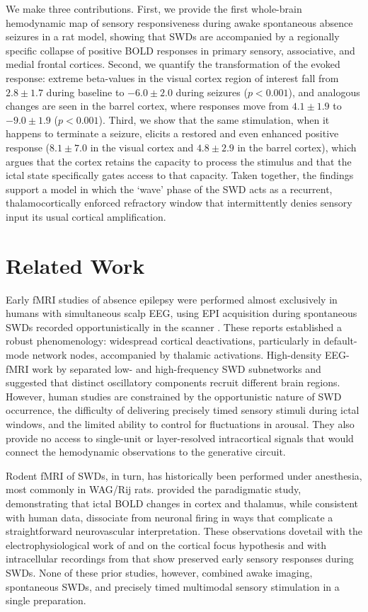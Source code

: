 We make three contributions. First, we provide the first whole-brain hemodynamic map of sensory responsiveness during awake spontaneous absence seizures in a rat model, showing that SWDs are accompanied by a regionally specific collapse of positive BOLD responses in primary sensory, associative, and medial frontal cortices. Second, we quantify the transformation of the evoked response: extreme beta-values in the visual cortex region of interest fall from $2.8 \pm 1.7$ during baseline to $-6.0 \pm 2.0$ during seizures ($p < 0.001$), and analogous changes are seen in the barrel cortex, where responses move from $4.1 \pm 1.9$ to $-9.0 \pm 1.9$ ($p < 0.001$). Third, we show that the same stimulation, when it happens to terminate a seizure, elicits a restored and even enhanced positive response ($8.1 \pm 7.0$ in the visual cortex and $4.8 \pm 2.9$ in the barrel cortex), which argues that the cortex retains the capacity to process the stimulus and that the ictal state specifically gates access to that capacity. Taken together, the findings support a model in which the `wave' phase of the SWD acts as a recurrent, thalamocortically enforced refractory window that intermittently denies sensory input its usual cortical amplification.

\section{Related Work}

Early fMRI studies of absence epilepsy were performed almost exclusively in humans with simultaneous scalp EEG, using EPI acquisition during spontaneous SWDs recorded opportunistically in the scanner \citep{gotman2005,moeller2008}. These reports established a robust phenomenology: widespread cortical deactivations, particularly in default-mode network nodes, accompanied by thalamic activations. High-density EEG-fMRI work by \citet{tenney2014} separated low- and high-frequency SWD subnetworks and suggested that distinct oscillatory components recruit different brain regions. However, human studies are constrained by the opportunistic nature of SWD occurrence, the difficulty of delivering precisely timed sensory stimuli during ictal windows, and the limited ability to control for fluctuations in arousal. They also provide no access to single-unit or layer-resolved intracortical signals that would connect the hemodynamic observations to the generative circuit.

Rodent fMRI of SWDs, in turn, has historically been performed under anesthesia, most commonly in WAG/Rij rats. \citet{mishra2011} provided the paradigmatic study, demonstrating that ictal BOLD changes in cortex and thalamus, while consistent with human data, dissociate from neuronal firing in ways that complicate a straightforward neurovascular interpretation. These observations dovetail with the electrophysiological work of \citet{polack2007} and \citet{meeren2002} on the cortical focus hypothesis and with intracellular recordings from \citet{chipaux2013} that show preserved early sensory responses during SWDs. None of these prior studies, however, combined awake imaging, spontaneous SWDs, and precisely timed multimodal sensory stimulation in a single preparation.

